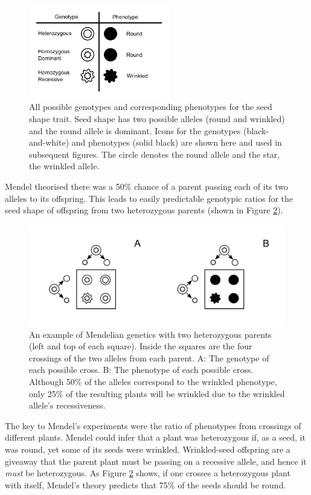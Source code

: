 \documentclass[english,floatsintext,man]{apa6}
\theoremstyle{definition}
\theoremstyle{definition}
\theoremstyle{definition}
\theoremstyle{remark}
\begin{document}
\begin{figure}
\includegraphics[width=2.42in]{../../figures/img/Fig1IconKey} \caption{All possible genotypes and corresponding phenotypes for the seed shape trait. Seed shape has two possible alleles (round and wrinkled) and the round allele is dominant. Icons for the genotypes (black-and-white) and phenotypes (solid black) are shown here and used in subsequent figures. The circle denotes the round allele and the star, the wrinkled allele.}\label{fig:MendelKey}
\end{figure}

Mendel theorised there was a 50\% chance of a parent passing each of its
two alleles to its offspring. This leads to easily predictable genotypic
ratios for the seed shape of offspring from two heterozygous parents
(shown in Figure \ref{fig:MendelGenes}).

\begin{figure}
\includegraphics[width=5.68in]{../../figures/img/Fig2GeneEx} \caption{An example of Mendelian genetics with two heterozygous parents (left and top of each square). Inside the squares are the four crossings of the two alleles from each parent. A: The genotype of each possible cross. B: The phenotype of each possible cross. Although 50\% of the alleles correspond to the wrinkled phenotype, only 25\% of the resulting plants will be wrinkled due to the wrinkled allele's recessiveness.}\label{fig:MendelGenes}
\end{figure}

The key to Mendel's experiments were the ratio of phenotypes from
crossings of different plants. Mendel could infer that a plant was
heterozygous if, as a seed, it was round, yet some of its seeds were
wrinkled. Wrinkled-seed offspring are a giveaway that the parent plant
must be passing on a recessive allele, and hence it \emph{must} be
heterozygous. As Figure \ref{fig:MendelGenes} shows, if one crosses a
heterozygous plant with itself, Mendel's theory predicts that 75\% of
the seeds should be round.
\end{document}
